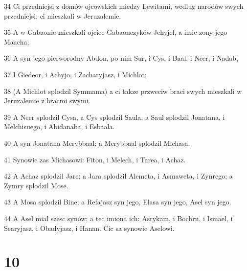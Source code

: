 \par 34 Ci przedniejsi z domów ojcowskich miedzy Lewitami, wedlug narodów swych przedniejsi; ci mieszkali w Jeruzalemie.
\par 35 A w Gabaonie mieszkali ojciec Gabaonczyków Jehyjel, a imie zony jego Maacha;
\par 36 A syn jego pierworodny Abdon, po nim Sur, i Cys, i Baal, i Neer, i Nadab,
\par 37 I Giedeor, i Achyjo, i Zacharyjasz, i Michlot;
\par 38 (A Michlot splodzil Symmama) a ci takze przweciw braci swych mieszkali w Jeruzalemie z bracmi swymi.
\par 39 A Neer splodzil Cysa, a Cys splodzil Saula, a Saul splodzil Jonatana, i Melchisuego, i Abidanaba, i Esbaala.
\par 40 A syn Jonatana Merybbaal; a Merybbaal splodzil Michasa.
\par 41 Synowie zas Michasowi: Fiton, i Melech, i Tarea, i Achaz.
\par 42 A Achaz splodzil Jare; a Jara splodzil Alemeta, i Asmaweta, i Zynrego; a Zymry splodzil Mose.
\par 43 A Mosa splodzil Bine; a Refajasz syn jego, Elasa syn jego, Asel syn jego.
\par 44 A Asel mial szesc synów; a tec imiona ich: Asrykam, i Bochru, i Ismael, i Searyjasz, i Obadyjasz, i Hanan. Cic sa synowie Aselowi.

\chapter{10}

